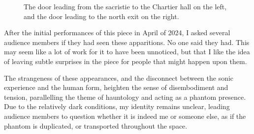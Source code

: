 \documentclass[12pt,twoside,maitrise]{dms_ks}
\theoremstyle{definition}
\begin{document}
{\begin{figure}[h]
    \centering
    \caption{The door leading from the sacristie to the Chartier hall on the left, and the door leading to the north exit on the right.}
    \label{fig:sidebyside}
\end{figure}

After the initial performances of this piece in April of 2024, I asked several audience members if they had seen these apparitions. 
No one said they had. 
This may seem like a lot of work for it to have been unnoticed, but that I like the idea of leaving subtle surprises in the piece for people that might happen upon them.

The strangeness of these appearances, and the disconnect between the sonic experience and the human form, heighten the sense of disembodiment and tension, parallelling the theme of hauntology and acting as a phantom presence. 
Due to the relatively dark conditions, my identity remains unclear, leading audience members to question whether it is indeed me or someone else, as if the phantom is duplicated, or transported throughout the space.

}
\end{document}
